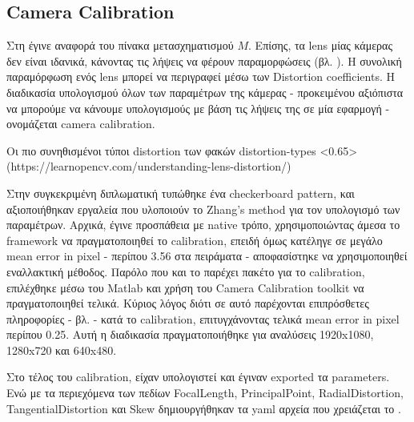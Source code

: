 \subsection{Camera Calibration} \label{sec:camera-calibration}
Στη  έγινε αναφορά του πίνακα μετασχηματισμού $M$. Επίσης, τα lens μίας κάμερας δεν είναι ιδανικά, κάνοντας τις λήψεις να φέρουν παραμορφώσεις (βλ. ). Η συνολική παραμόρφωση ενός lens μπορεί να περιγραφεί μέσω των Distortion coefficients. Η διαδικασία υπολογισμού όλων των παραμέτρων της κάμερας - προκειμένου αξιόπιστα να μπορούμε να κάνουμε υπολογισμούς με βάση τις λήψεις της σε μία  εφαρμογή - ονομάζεται camera calibration. 

%
{Οι πιο συνηθισμένοι τύποι distortion των φακών}%
{distortion-types}%
<0.65>%
(https://learnopencv.com/understanding-lens-distortion/)

Στην συγκεκριμένη διπλωματική τυπώθηκε ένα checkerboard pattern, και α\-ξιο\-ποιή\-θη\-καν εργαλεία που υλοποιούν το Zhang's method για τον υπολογισμό των πα\-ρα\-μέ\-τρων. Αρχικά, έγινε προσπάθεια με native τρόπο, χρησιμοποιώντας άμεσα το framework  να πραγματοποιηθεί το ca\-li\-bra\-tion, επειδή όμως κατέληγε σε μεγάλο mean error in pixel - περίπου 3.56 στα πειράματα - αποφασίστηκε να χρησιμοποιηθεί εναλλακτική μέθοδος. Παρόλο που και το  παρέχει πακέτο για το ca\-li\-bra\-tion, επιλέχθηκε μέσω του Matlab και χρήση του Camera Calibration toolkit να πραγματοποιηθεί τελικά. Κύριος λόγος διότι σε αυτό παρέχονται επιπρόσθετες πληροφορίες - βλ.  - κατά το calibration, επιτυγχάνοντας τελικά mean error in pixel περίπου 0.25. Αυτή η διαδικασία πραγματοποιήθηκε για αναλύσεις 1920x1080, 1280x720 και 640x480. 

Στο τέλος του calibration, είχαν υπολογιστεί και έγιναν exported τα parameters. Ενώ με τα περιεχόμενα των πεδίων FocalLength, PrincipalPoint, RadialDistortion, TangentialDistortion και Skew δημιουργήθηκαν τα yaml αρχεία που χρειάζεται το  \cite{ros-calibration-instr1} \cite{ros-calibration-instr2}.


